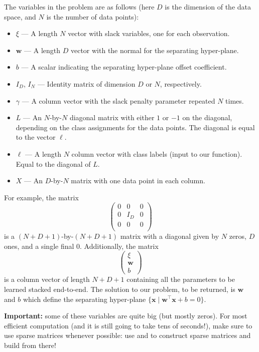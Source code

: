 \documentclass[11pt,noanswers,addpoints]{exam}
\newcommand{\x}{\mathbf x}
\newcommand{\w}{\mathbf w}
\begin{document}
\begin{enumerate}
The variables in the problem are as follows (here $D$ is the dimension of the data space, and $N$ is the number of data points):
\begin{itemize}
\item $\xi$ --- A length $N$ vector with slack variables, one for each observation.
\item $\w$ --- A length $D$ vector with the normal for the separating hyper-plane.
\item $b$ --- A scalar indicating the separating hyper-plane offset coefficient.
\item $I_D$, $I_N$ --- Identity matrix of dimension $D$ or $N$, respectively.
\item $\gamma$ --- A column vector with the slack penalty parameter repeated $N$ times.
\item $L$ --- An $N$-by-$N$ diagonal matrix with either $1$ or $-1$ on the diagonal, depending on the 
class assignments for the data points. The diagonal is equal to the vector $\ell$.
\item $\ell$ --- A length $N$ column vector with class labels (input to our function). Equal to the diagonal of $L$.
\item $X$ --- An $D$-by-$N$ matrix with one data point in each column. %
\end{itemize}

For example, the matrix $$\begin{pmatrix}
0 & 0 & 0\\
0 & I_D & 0\\
0 & 0 & 0\\
\end{pmatrix}$$
is a $(N+D+1)$-by-$(N+D+1)$ matrix with a diagonal given by $N$ zeros, $D$ ones, and a single final $0$. Additionally, the matrix 
$$\begin{pmatrix}
\xi \\
\w \\
b
\end{pmatrix}$$ is a column vector of length $N+D+1$ containing all the parameters to be learned stacked end-to-end.
The solution to our problem, to be returned, is $\w$ and $b$ which define the separating hyper-plane
$\{\x \mid \w^\top \x + b = 0\}$. 

\textbf{Important:} some of these variables are quite big (but mostly zeros). For most efficient computation (and it is still going to take tens of seconds!), make sure to use sparse matrices whenever possible: use  and  to construct sparse matrices and build from there!


\end{enumerate}
\end{document}
